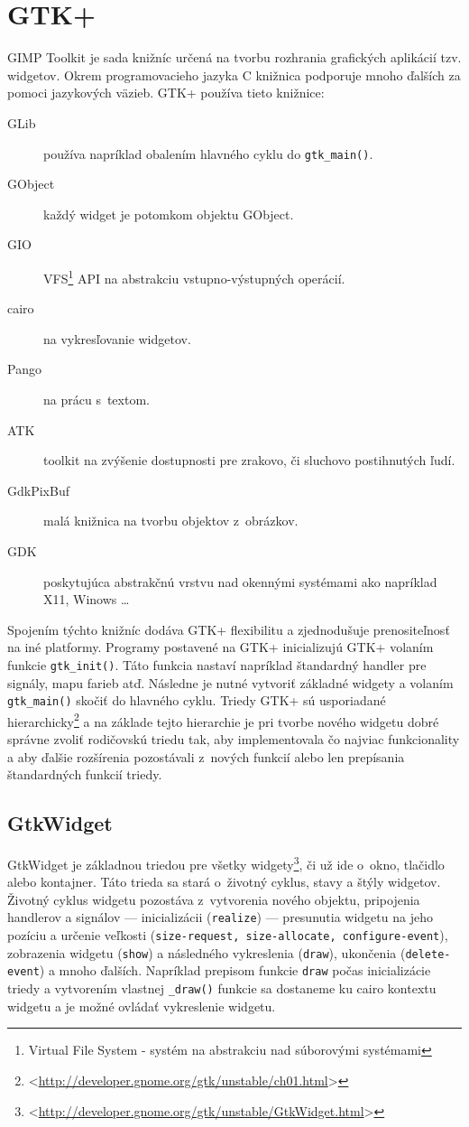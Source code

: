 \documentclass[12pt,oneside,final]{fithesis2}
\begin{document}
\section{GTK+}
GIMP Toolkit je sada knižníc určená na tvorbu rozhrania grafických aplikácií tzv. widgetov. Okrem programovacieho jazyka C knižnica podporuje mnoho ďalších za pomoci jazykových väzieb. GTK+ používa tieto knižnice:
\begin{description}
\item[GLib] používa napríklad obalením hlavného cyklu do \texttt{gtk\_main()}.
\item[GObject] každý widget je potomkom objektu GObject.
\item[GIO] VFS\footnote{Virtual File System - systém na abstrakciu nad súborovými systémami} API na abstrakciu vstupno-výstupných operácií.
\item[cairo] na vykresľovanie widgetov.
\item[Pango] na prácu s~textom.
\item[ATK] toolkit na zvýšenie dostupnosti pre zrakovo, či sluchovo postihnutých ľudí.
\item[GdkPixBuf] malá knižnica na tvorbu objektov z~obrázkov.
\item[GDK] poskytujúca abstrakčnú vrstvu nad okennými systémami ako napríklad X11, Winows \dots
\end{description}
Spojením týchto knižníc dodáva GTK+ flexibilitu a zjednodušuje prenositeľnosť na iné platformy.
Programy postavené na GTK+ inicializujú GTK+ volaním funkcie \texttt{gtk\_init()}. Táto funkcia nastaví napríklad štandardný handler pre signály, mapu farieb atď. Následne je nutné vytvoriť základné widgety a volaním \texttt{gtk\_main()} skočiť do hlavného cyklu. Triedy GTK+ sú usporiadané hierarchicky\footnote{<\url{http://developer.gnome.org/gtk/unstable/ch01.html}>} a na základe tejto hierarchie je pri tvorbe nového widgetu dobré správne zvoliť rodičovskú triedu tak, aby implementovala čo najviac funkcionality a aby ďalšie rozšírenia pozostávali z~nových funkcií alebo len prepísania štandardných funkcií triedy.
\subsection{GtkWidget}
GtkWidget je základnou triedou pre všetky widgety\footnote{<\url{http://developer.gnome.org/gtk/unstable/GtkWidget.html}>}, či už ide o~okno, tlačidlo alebo kontajner. Táto trieda sa stará o~životný cyklus, stavy a štýly widgetov. Životný cyklus widgetu pozostáva z~vytvorenia nového objektu, pripojenia handlerov a signálov --- inicializácii (\texttt{realize}) --- presunutia widgetu na jeho pozíciu a určenie veľkosti (\texttt{size-request, size-allocate, configure-event}), zobrazenia widgetu (\texttt{show}) a následného vykreslenia (\texttt{draw}), ukončenia (\texttt{delete-event}) a mnoho ďalších. Napríklad prepisom funkcie \texttt{draw} počas inicializácie triedy a vytvorením vlastnej \texttt{\_draw()} funkcie sa dostaneme ku cairo kontextu widgetu a je možné ovládať vykreslenie widgetu.
\end{document}
